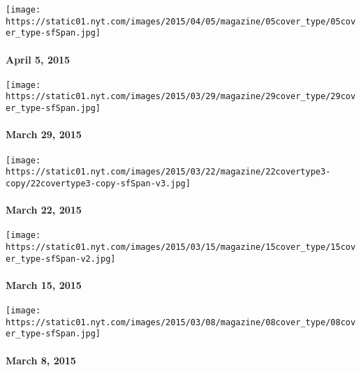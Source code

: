 \href{http://www.nytimes.com/indexes/2015/04/05/magazine/index.html}{}

\texttt{[image: https://static01.nyt.com/images/2015/04/05/magazine/05cover\_type/05cover\_type-sfSpan.jpg]}

\hypertarget{april-5-2015}{%
\paragraph{April 5, 2015}\label{april-5-2015}}

\href{http://www.nytimes.com/indexes/2015/03/29/magazine/index.html}{}

\texttt{[image: https://static01.nyt.com/images/2015/03/29/magazine/29cover\_type/29cover\_type-sfSpan.jpg]}

\hypertarget{march-29-2015}{%
\paragraph{March 29, 2015}\label{march-29-2015}}

\href{http://www.nytimes.com/indexes/2015/03/22/magazine/index.html}{}

\texttt{[image: https://static01.nyt.com/images/2015/03/22/magazine/22covertype3-copy/22covertype3-copy-sfSpan-v3.jpg]}

\hypertarget{march-22-2015}{%
\paragraph{March 22, 2015}\label{march-22-2015}}

\href{http://www.nytimes.com/indexes/2015/03/15/magazine/index.html}{}

\texttt{[image: https://static01.nyt.com/images/2015/03/15/magazine/15cover\_type/15cover\_type-sfSpan-v2.jpg]}

\hypertarget{march-15-2015}{%
\paragraph{March 15, 2015}\label{march-15-2015}}

\href{http://www.nytimes.com/indexes/2015/03/08/magazine/index.html}{}

\texttt{[image: https://static01.nyt.com/images/2015/03/08/magazine/08cover\_type/08cover\_type-sfSpan.jpg]}

\hypertarget{march-8-2015}{%
\paragraph{March 8, 2015}\label{march-8-2015}}

